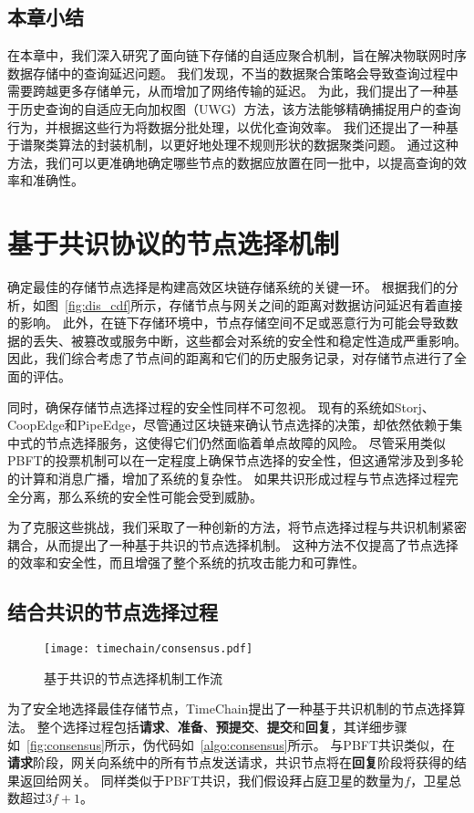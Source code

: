 \section{本章小结}
在本章中，我们深入研究了面向链下存储的自适应聚合机制，旨在解决物联网时序数据存储中的查询延迟问题。
我们发现，不当的数据聚合策略会导致查询过程中需要跨越更多存储单元，从而增加了网络传输的延迟。
为此，我们提出了一种基于历史查询的自适应无向加权图（UWG）方法，该方法能够精确捕捉用户的查询行为，并根据这些行为将数据分批处理，以优化查询效率。
我们还提出了一种基于谱聚类算法的封装机制，以更好地处理不规则形状的数据聚类问题。
通过这种方法，我们可以更准确地确定哪些节点的数据应放置在同一批中，以提高查询的效率和准确性。

\chapter{基于共识协议的节点选择机制}
\label{sec:consensus}
确定最佳的存储节点选择是构建高效区块链存储系统的关键一环。
根据我们的分析，如图~\autoref{fig:dis_cdf}所示，存储节点与网关之间的距离对数据访问延迟有着直接的影响。
此外，在链下存储环境中，节点存储空间不足或恶意行为可能会导致数据的丢失、被篡改或服务中断，这些都会对系统的安全性和稳定性造成严重影响。
因此，我们综合考虑了节点间的距离和它们的历史服务记录，对存储节点进行了全面的评估。

同时，确保存储节点选择过程的安全性同样不可忽视。
现有的系统如Storj、CoopEdge和PipeEdge，尽管通过区块链来确认节点选择的决策，却依然依赖于集中式的节点选择服务，这使得它们仍然面临着单点故障的风险。
尽管采用类似PBFT的投票机制可以在一定程度上确保节点选择的安全性，但这通常涉及到多轮的计算和消息广播，增加了系统的复杂性。
如果共识形成过程与节点选择过程完全分离，那么系统的安全性可能会受到威胁。

为了克服这些挑战，我们采取了一种创新的方法，将节点选择过程与共识机制紧密耦合，从而提出了一种基于共识的节点选择机制。
这种方法不仅提高了节点选择的效率和安全性，而且增强了整个系统的抗攻击能力和可靠性。

\section{结合共识的节点选择过程}

\begin{figure}[t]
    \centering
    \texttt{[image: timechain/consensus.pdf]}
    \caption{基于共识的节点选择机制工作流}
    \label{fig:consensus}
\end{figure}

为了安全地选择最佳存储节点，TimeChain提出了一种基于共识机制的节点选择算法。
整个选择过程包括\textbf{请求}、\textbf{准备}、\textbf{预提交}、\textbf{提交}和\textbf{回复}，其详细步骤如~\autoref{fig:consensus}所示，伪代码如~\autoref{algo:consensus}所示。
与PBFT共识类似，在\textbf{请求}阶段，网关向系统中的所有节点发送请求，共识节点将在\textbf{回复}阶段将获得的结果返回给网关。
同样类似于PBFT共识，我们假设拜占庭卫星的数量为$f$，卫星总数超过$3f+1$。

